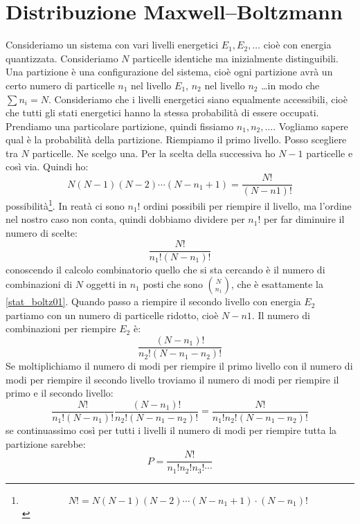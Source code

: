 \section{Distribuzione Maxwell--Boltzmann}
Consideriamo un sistema con vari livelli energetici $E_1, E_2, \ldots$ cioè con energia quantizzata. Consideriamo $N$ particelle identiche ma inizialmente distinguibili. Una partizione è una configurazione del sistema, cioè ogni partizione avrà un certo numero di particelle $n_1$ nel livello $E_1$, $n_2$ nel livello $n_2$ \ldots in modo che $\sum n_i=N$. Consideriamo che i livelli energetici siano equalmente accessibili, cioè che tutti gli stati energetici hanno la stessa probabilità di essere occupati. Prendiamo una particolare partizione, quindi fissiamo $n_1, n_2, \ldots$. Vogliamo sapere qual è la probabilità della partizione. Riempiamo il primo livello. Posso scegliere tra $N$ particelle. Ne scelgo una. Per la scelta della successiva ho $N-1$ particelle e così via. Quindi ho:
\begin{equation}
N(N-1)(N-2)\cdots(N-n_1+1)=\frac{N!}{\left(N-n1\right)!}
\end{equation}
possibilità\footnote{\[
N!=N(N-1)(N-2)\cdots(N-n_1+1)\cdot(N-n_1)!
\]
}. In reatà ci sono $n_1!$ ordini possibili per riempire il livello, ma l'ordine nel nostro caso non conta, quindi dobbiamo dividere per $n_1!$ per far diminuire il numero di scelte:
\begin{equation}
\frac{N!}{n_1!(N-n_1)!}
\label{stat_boltz01}
\end{equation}
conoscendo il calcolo combinatorio quello che si sta cercando è il numero di combinazioni di $N$ oggetti in $n_1$ posti che sono $\binom{N}{n_1}$, che è esattamente la \eqref{stat_boltz01}. Quando passo a riempire il secondo livello con energia $E_2$ partiamo con un numero di particelle ridotto, cioè $N-n1$. Il numero di combinazioni per riempire $E_2$ è:
\begin{equation}
\frac{(N-n_1)!}{n_2!(N-n_1-n_2)!}
\end{equation}
Se moltiplichiamo il numero di modi per riempire il primo livello con il numero di modi per riempire il secondo livello troviamo il numero di modi per riempire il primo e il secondo livello:
\begin{equation}
\frac{N!}{n_1!(N-n_1)!}\frac{(N-n_1)!}{n_2!(N-n_1-n_2)!}=\frac{N!}{n_1!n_2!(N-n_1-n_2)!}
\end{equation}
se continuassimo così per tutti i livelli il numero di modi per riempire tutta la partizione sarebbe:
\begin{equation}
P=\frac{N!}{n_1!n_2!n_3!\cdots}
\label{stat_001}
\end{equation}
